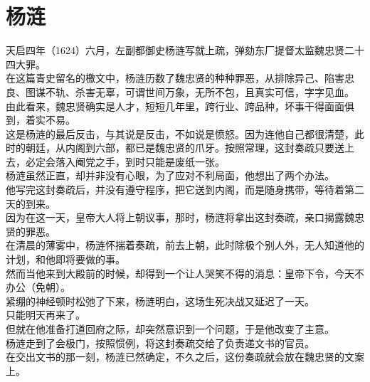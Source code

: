 \section{杨涟}
\ifnum{}
	\begin{multicols}{\theparacolNo}
\fi
天启四年（1624）六月，左副都御史杨涟写就上疏，弹劾东厂提督太监魏忠贤二十四大罪。\\

在这篇青史留名的檄文中，杨涟历数了魏忠贤的种种罪恶，从排除异己、陷害忠良、图谋不轨、杀害无辜，可谓世间万象，无所不包，且真实可信，字字见血。\\

由此看来，魏忠贤确实是人才，短短几年里，跨行业、跨品种，坏事干得面面俱到，着实不易。\\

这是杨涟的最后反击，与其说是反击，不如说是愤怒。因为连他自己都很清楚，此时的朝廷，从内阁到六部，都已是魏忠贤的爪牙。按照常理，这封奏疏只要送上去，必定会落入阉党之手，到时只能是废纸一张。\\

杨涟虽然正直，却并非没有心眼，为了应对不利局面，他想出了两个办法。\\

他写完这封奏疏后，并没有遵守程序，把它送到内阁，而是随身携带，等待着第二天的到来。\\

因为在这一天，皇帝大人将上朝议事，那时，杨涟将拿出这封奏疏，亲口揭露魏忠贤的罪恶。\\

在清晨的薄雾中，杨涟怀揣着奏疏，前去上朝，此时除极个别人外，无人知道他的计划，和他即将要做的事。\\

然而当他来到大殿前的时候，却得到一个让人哭笑不得的消息：皇帝下令，今天不办公（免朝）。\\

紧绷的神经顿时松弛了下来，杨涟明白，这场生死决战又延迟了一天。\\

只能明天再来了。\\

但就在他准备打道回府之际，却突然意识到一个问题，于是他改变了主意。\\

杨涟走到了会极门，按照惯例，将这封奏疏交给了负责递文书的官员。\\

在交出文书的那一刻，杨涟已然确定，不久之后，这份奏疏就会放在魏忠贤的文案上。\\


\end{multicols}
